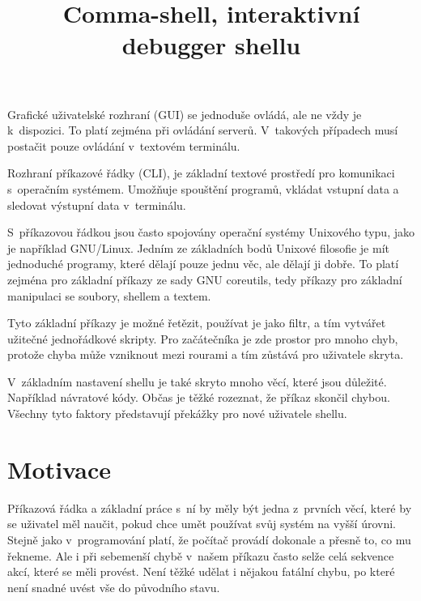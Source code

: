 \documentclass[thesis=M,czech]{FITthesis}[2012/06/26]
\title{Comma-shell, interaktivní debugger shellu}
\begin{document}
\lstset{basicstyle=\footnotesize\ttfamily,breaklines=true,showstringspaces=false,captionpos=b}
\renewcommand{\lstlistingname}{Ukázka}




\begin{introduction}


Grafické uživatelské rozhraní (GUI) se jednoduše ovládá, ale ne vždy je k~dispozici. To platí zejména při ovládání serverů. V~takových případech musí postačit pouze ovládání v~textovém terminálu.

Rozhraní příkazové řádky (CLI), je základní textové prostředí pro komunikaci s~operačním systémem. Umožňuje spouštění programů, vkládat vstupní data a sledovat výstupní data v~terminálu.

S~příkazovou řádkou jsou často spojovány operační systémy Unixového typu, jako je například GNU/Linux. Jedním ze základních bodů Unixové filosofie je mít jednoduché programy, které dělají pouze jednu věc, ale dělají ji dobře. To platí zejména pro základní příkazy ze sady GNU coreutils, tedy příkazy pro základní manipulaci se soubory, shellem a textem.

Tyto základní příkazy je možné řetězit, používat je jako filtr, a tím vytvářet užitečné jednořádkové skripty. Pro začátečníka je zde prostor pro mnoho chyb, protože chyba může vzniknout mezi rourami a tím zůstává pro uživatele skryta.

V~základním nastavení shellu je také skryto mnoho věcí, které jsou důležité. Například návratové kódy. Občas je těžké rozeznat, že příkaz skončil chybou. Všechny tyto faktory představují překážky pro nové uživatele shellu.


\section{Motivace}

Příkazová řádka a základní práce s~ní by měly být jedna z~prvních věcí, které by se uživatel měl naučit, pokud chce umět používat svůj systém na vyšší úrovni. Stejně jako v~programování platí, že počítač provádí dokonale a přesně to, co mu řekneme. Ale i při sebemenší chybě v~našem příkazu často selže celá sekvence akcí, které se měli provést. Není těžké udělat i nějakou fatální chybu, po které není snadné uvést vše do původního stavu.


\end{introduction}
\end{document}
